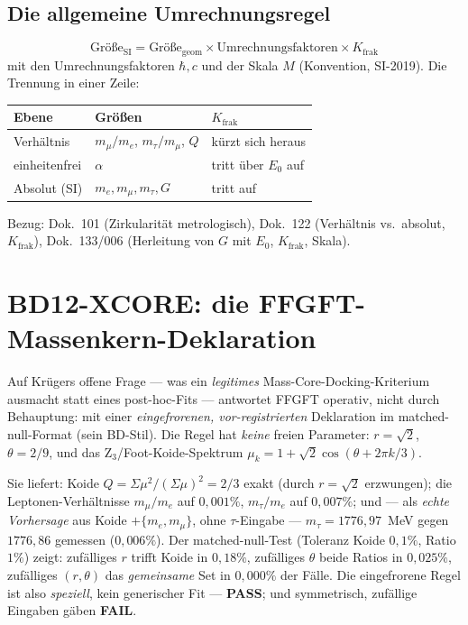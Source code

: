 \subsection{Die allgemeine Umrechnungsregel}
\[
\boxed{\ \text{Gr\"o\ss e}_{\text{SI}}=\text{Gr\"o\ss e}_{\text{geom}}\times\text{Umrechnungsfaktoren}\times K_{\text{frak}}\ }
\]
mit den Umrechnungsfaktoren $\hbar,c$ und der Skala $M$ (Konvention, SI-2019). Die Trennung in einer
Zeile:
\begin{center}
\begin{tabular}{@{}p{3cm} p{6.2cm} p{2.8cm}@{}}
\toprule
Ebene & Gr\"o\ss en & $K_{\text{frak}}$ \\
\midrule
Verh\"altnis & $m_\mu/m_e$, $m_\tau/m_\mu$, $Q$ & k\"urzt sich heraus \\
einheitenfrei & $\alpha$ & tritt \"uber $E_0$ auf \\
Absolut (SI) & $m_e,m_\mu,m_\tau,G$ & tritt auf \\
\bottomrule
\end{tabular}
\end{center}
Bezug: Dok.~101 (Zirkularit\"at metrologisch), Dok.~122 (Verh\"altnis vs.\ absolut, $K_{\text{frak}}$),
Dok.~133/006 (Herleitung von $G$ mit $E_0$, $K_{\text{frak}}$, Skala).

\section{BD12-XCORE: die FFGFT-Massenkern-Deklaration}
Auf Kr\"ugers offene Frage --- was ein \emph{legitimes} Mass-Core-Docking-Kriterium ausmacht statt
eines post-hoc-Fits --- antwortet FFGFT operativ, nicht durch Behauptung: mit einer
\emph{eingefrorenen, vor-registrierten} Deklaration im matched-null-Format (sein BD-Stil). Die Regel
hat \emph{keine} freien Parameter: $r=\sqrt2$, $\theta=2/9$, und das Z$_3$/Foot-Koide-Spektrum
$\mu_k = 1+\sqrt2\cos(\theta+2\pi k/3)$.

Sie liefert: Koide $Q=\Sigma\mu^2/(\Sigma\mu)^2 = 2/3$ exakt (durch $r=\sqrt2$ erzwungen); die
Leptonen-Verh\"altnisse $m_\mu/m_e$ auf $0{,}001\%$, $m_\tau/m_e$ auf $0{,}007\%$; und --- als
\emph{echte Vorhersage} aus Koide $+\{m_e,m_\mu\}$, ohne $\tau$-Eingabe --- $m_\tau=1776{,}97$~MeV
gegen $1776{,}86$ gemessen ($0{,}006\%$). Der matched-null-Test (Toleranz Koide $0{,}1\%$, Ratio
$1\%$) zeigt: zuf\"alliges $r$ trifft Koide in $0{,}18\%$, zuf\"alliges $\theta$ beide Ratios in
$0{,}025\%$, zuf\"alliges $(r,\theta)$ das \emph{gemeinsame} Set in $0{,}000\%$ der F\"alle. Die
eingefrorene Regel ist also \emph{speziell}, kein generischer Fit --- \textbf{PASS}; und symmetrisch,
zuf\"allige Eingaben g\"aben \textbf{FAIL}.

